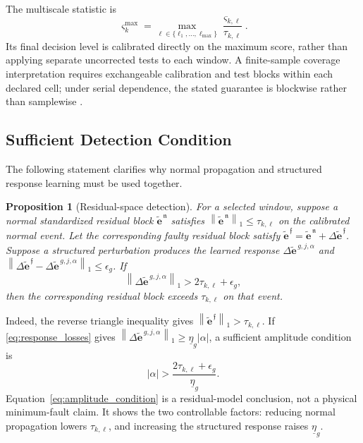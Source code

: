 \documentclass[journal]{IEEEtran}
\newtheorem{proposition}{Proposition}
\newcommand{\norm}[1]{\left\lVert #1\right\rVert}
\newcommand{\abs}[1]{\left\lvert #1\right\rvert}
\newcommand{\1}{\bm 1}
\begin{document}
The multiscale statistic is
\begin{equation}
\varsigma_k^{\max}=
\max_{\ell\in\{\ell_1,\ldots,\ell_{\max}\}}
\frac{\varsigma_{k,\ell}}{\tau_{k,\ell}}.
\label{eq:multiscale}
\end{equation}
Its final decision level is calibrated directly on the maximum score, rather
than applying separate uncorrected tests to each window. A finite-sample
coverage interpretation requires exchangeable calibration and test blocks
within each declared cell; under serial dependence, the stated guarantee is
blockwise rather than samplewise \cite{vovk2005,xu2021}.

\subsection{Sufficient Detection Condition}
The following statement clarifies why normal propagation and structured
response learning must be used together.

\begin{proposition}[Residual-space detection]
\label{prop:detection}
For a selected window, suppose a normal standardized residual block
$\widetilde{\bm e}^{\,\mathfrak n}$ satisfies
$\norm{\widetilde{\bm e}^{\,\mathfrak n}}_1\leq\tau_{k,\ell}$ on the
calibrated normal event. Let the corresponding faulty residual block satisfy
$\widetilde{\bm e}^{\,\mathfrak f}
=\widetilde{\bm e}^{\,\mathfrak n}
+\Delta\widetilde{\bm e}^{\,\mathfrak f}$.
Suppose a structured perturbation produces the learned response
$\Delta\widetilde{\bm e}^{\,g,j,\alpha}$ and
$\norm{\Delta\widetilde{\bm e}^{\,\mathfrak f}
-\Delta\widetilde{\bm e}^{\,g,j,\alpha}}_1\leq\epsilon_g$. If
\begin{equation}
\norm{\Delta\widetilde{\bm e}^{\,g,j,\alpha}}_1
>2\tau_{k,\ell}+\epsilon_g,
\label{eq:detection_condition}
\end{equation}
then the corresponding residual block exceeds $\tau_{k,\ell}$ on that event.
\end{proposition}

Indeed, the reverse triangle inequality gives
$\norm{\widetilde{\bm e}^{\,\mathfrak f}}_1
>\tau_{k,\ell}$. If
\eqref{eq:response_losses} gives
$\norm{\Delta\widetilde{\bm e}^{\,g,j,\alpha}}_1
\geq\underline{\eta}_g\abs{\alpha}$, a sufficient amplitude condition is
\begin{equation}
\abs{\alpha}>
\frac{2\tau_{k,\ell}+\epsilon_g}{\underline{\eta}_g}.
\label{eq:amplitude_condition}
\end{equation}
Equation~\eqref{eq:amplitude_condition} is a residual-model conclusion, not a
physical minimum-fault claim. It shows the two controllable factors: reducing
normal propagation lowers $\tau_{k,\ell}$, and increasing the structured
response raises $\underline{\eta}_g$.
\end{document}
